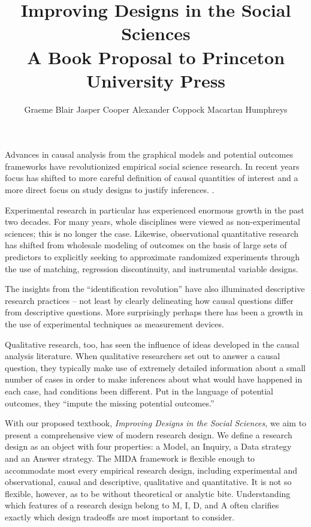 \documentclass[11pt]{article}
\title{Improving Designs in the Social Sciences \\ {\normalsize A Book Proposal to Princeton University Press}}
\author{Graeme Blair \quad Jasper Cooper \quad Alexander Coppock \quad Macartan Humphreys}
\begin{document}
\maketitle

Advances in causal analysis from the graphical models and potential outcomes frameworks have revolutionized empirical social science research. In recent years focus has shifted to more careful definition of causal quantities of interest and a more direct focus on study designs to justify inferences. .

Experimental research in particular has experienced enormous growth in the past two decades. For many years, whole disciplines were viewed as non-experimental sciences; this is no longer the case. Likewise, observational quantitative research has shifted from wholesale modeling of outcomes on the basis of large sets of predictors to explicitly seeking to approximate randomized experiments through the use of matching, regression discontinuity, and instrumental variable designs.

The insights from the ``identification revolution'' have also illuminated descriptive research practices -- not least by clearly delineating how causal questions differ from descriptive questions. More surprisingly perhaps there has been a growth in the use of experimental techniques as measurement devices. 

Qualitative research, too, has seen the influence of ideas developed in the causal analysis literature. When qualitative researchers set out to answer a causal question, they typically make use of extremely detailed information about a small number of cases in order to make inferences about what would have happened in each case, had conditions been different. Put in the language of potential outcomes, they ``impute the missing potential outcomes.'' 

With our proposed textbook, \textit{Improving Designs in the Social Sciences}, we aim to present a comprehensive view of modern research design. We define a research design as an object with four properties: a Model, an Inquiry, a Data strategy and an Answer strategy. The MIDA framework is flexible enough to accommodate most every empirical research design, including experimental and observational, causal and descriptive, qualitative and quantitative. It is not so flexible, however, as to be without theoretical or analytic bite. Understanding which features of a research design belong to M, I, D, and A often clarifies exactly which design tradeoffs are most important to consider.
\end{document}
